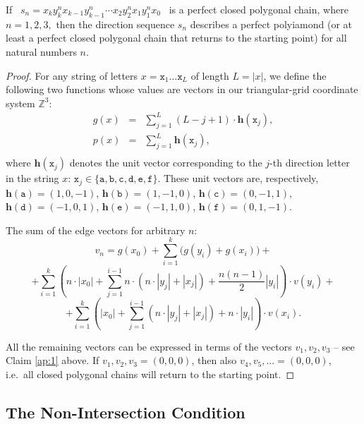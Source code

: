 \documentclass[utf8]{bjmc}
\begin{document}
\begin{theorem}\label{th:1}
If \   $s_n =
x_k y_k^{n} x_{k-1} y_{k-1}^{n} \cdots
x_2 y_2^{n} x_1 y_1^{n} x_0
$ \
is a perfect closed polygonal chain, where
$
n = 1,2,3,
$
then the direction sequence $s_n$ describes a perfect polyiamond
(or at least a perfect closed polygonal chain that returns to the starting
point) for all natural numbers $n$.
\end{theorem}
\begin{proof}


For any string of letters
$x=\mathtt{x}_1\ldots{}\mathtt{x}_L$ of length $L = |x|$, we define
the following two functions whose values are vectors in our triangular-grid
coordinate system $\mathbb{Z}^3$:
\[
\begin{array}{rcl}
g(x) & = & \sum_{j = 1}^{L} (L - j + 1) \cdot \mathbf{h}(\mathtt{x}_j),\\
p(x) & = & \sum_{j = 1}^{L} \mathbf{h}(\mathtt{x}_j),\\
\end{array}
\]
where $\mathbf{h}(\mathtt{x}_j)$ denotes the unit vector corresponding to the
$j$-th direction letter in the string $x$:
$\mathtt{x}_j \in \{ \mathtt{a}, \mathtt{b}, \mathtt{c}, \mathtt{d},
\mathtt{e}, \mathtt{f}\}$. These unit vectors are, respectively,
$\mathbf{h}(\mathtt{a}) = (1,0,-1)$,
$\mathbf{h}(\mathtt{b}) = (1,-1,0)$,
$\mathbf{h}(\mathtt{c}) = (0,-1,1)$,
$\mathbf{h}(\mathtt{d}) = (-1,0,1)$,
$\mathbf{h}(\mathtt{e}) = (-1,1,0)$,
$\mathbf{h}(\mathtt{f}) = (0,1,-1)$.


The sum of the edge vectors for arbitrary $n$:
\[
v_n =
g(x_0)
+
\sum_{i=1}^{k}
\bigl(g(y_i)+g(x_i)\bigr)+
\]
\[
+
\sum_{i=1}^{k}
\left(
n\cdot |x_0|
+
\sum_{j=1}^{i-1}
n\cdot (n\cdot |y_j| + |x_j|)
+
\frac{n(n-1)}{2}|y_i|
\right)
\cdot v(y_i)+
\]
\[
+
\sum_{i=1}^{k}
\left(
|x_0|
+
\sum_{j=1}^{i-1}
(n\cdot |y_j| + |x_j|)
+
n\cdot |y_i|
\right)
\cdot v(x_i).
\]



\bigskip

All the remaining vectors can be expressed in terms of the vectors
$v_1,v_2,v_3$ -- see Claim \ref{ap:1} above.
If $v_1,v_2,v_3=(0,0,0)$,
then also $v_4, v_5, ... =(0,0,0)$, i.e.\ all closed polygonal chains will return
to the starting point.

\end{proof}



\subsection{The Non-Intersection Condition}
\end{document}

